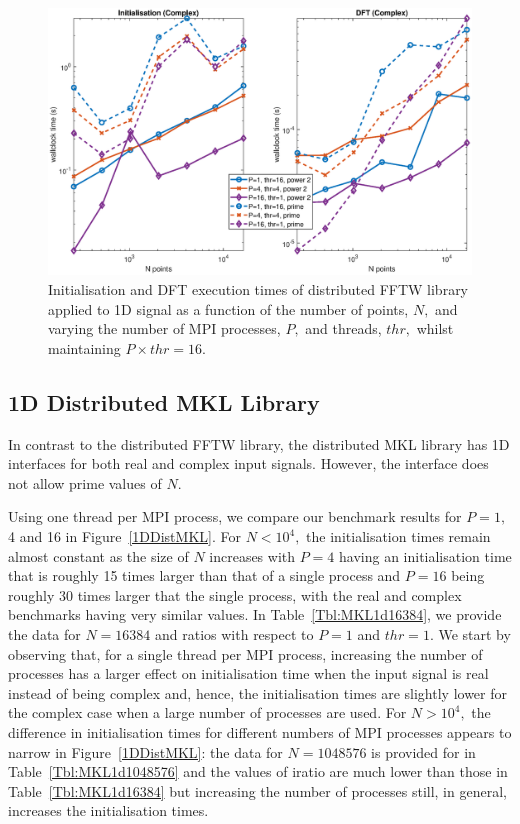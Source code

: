 \documentclass[a4paper]{article}
\begin{document}
\begin{figure}[htb]
    \centering
    \includegraphics[width=0.9\linewidth]{../results/fftw_1d_mpi_thr.eps}
  \caption{Initialisation and DFT execution times of distributed FFTW library applied to 1D signal as a function of the
    number of points, $N,$ and varying the number of MPI processes, $P,$ and threads, $thr,$ whilst maintaining $P\times thr=16.$}
  \label{1DDistFFTW16}
\end{figure}









\subsection{1D Distributed MKL Library}\label{Sec:1DDistMKL}
In contrast to the distributed FFTW library, the distributed MKL
library has 1D interfaces for both real and complex input
signals. However, the interface does not allow prime values of $N.$


Using one thread per MPI process, we compare our benchmark results for
$P=1,$ 4 and 16 in Figure~\ref{1DDistMKL}. For $N<10^4,$ the
initialisation times remain almost constant as the size of $N$
increases with $P=4$ having an initialisation time that is roughly 15
times larger than that of a single process and $P=16$ being roughly 30
times larger that the single process, with the real and complex
benchmarks having very similar values. In Table~\ref{Tbl:MKL1d16384},
we provide the data for $N=16384$ and ratios with respect to $P=1$ and
$thr=1.$ We start by observing that, for a single thread per MPI
process, increasing the number of processes has a larger effect on
initialisation time when the input signal is real instead of being
complex and, hence, the initialisation times are slightly lower for
the complex case when a large number of processes are used. For
$N>10^4,$ the difference in initialisation times for different numbers
of MPI processes appears to narrow in Figure~\ref{1DDistMKL}: the data
for $N=1048576$ is provided for in Table~\ref{Tbl:MKL1d1048576} and
the values of iratio are much lower than those in
Table~\ref{Tbl:MKL1d16384} but increasing the number of processes
still, in general, increases the initialisation times.
\end{document}
